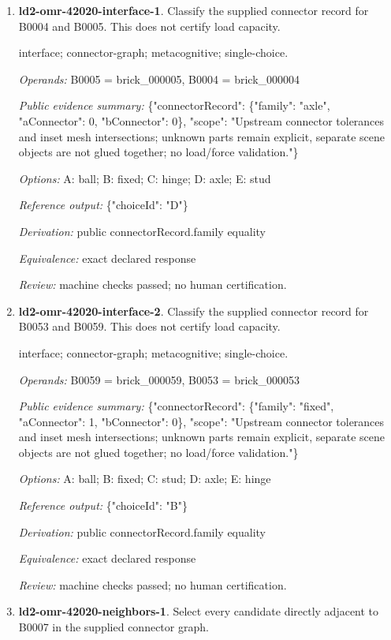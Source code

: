 \begin{enumerate}
\item \textbf{ld2-omr-42020-interface-1}. Classify the supplied connector record for B0004 and B0005. This does not certify load capacity.
\par{\small interface; connector-graph; metacognitive; single-choice.\par\textit{Operands:} B0005 = brick\_000005, B0004 = brick\_000004\par\textit{Public evidence summary:} \{"connectorRecord": \{"family": "axle", "aConnector": 0, "bConnector": 0\}, "scope": "Upstream connector tolerances and inset mesh intersections; unknown parts remain explicit, separate scene objects are not glued together; no load/force validation."\}\par\textit{Options:} A: ball; B: fixed; C: hinge; D: axle; E: stud\par\textit{Reference output:} \{"choiceId": "D"\}\par\textit{Derivation:} public connectorRecord.family equality\par\textit{Equivalence:} exact declared response\par\textit{Review:} machine checks passed; no human certification.}
\item \textbf{ld2-omr-42020-interface-2}. Classify the supplied connector record for B0053 and B0059. This does not certify load capacity.
\par{\small interface; connector-graph; metacognitive; single-choice.\par\textit{Operands:} B0059 = brick\_000059, B0053 = brick\_000053\par\textit{Public evidence summary:} \{"connectorRecord": \{"family": "fixed", "aConnector": 1, "bConnector": 0\}, "scope": "Upstream connector tolerances and inset mesh intersections; unknown parts remain explicit, separate scene objects are not glued together; no load/force validation."\}\par\textit{Options:} A: ball; B: fixed; C: stud; D: axle; E: hinge\par\textit{Reference output:} \{"choiceId": "B"\}\par\textit{Derivation:} public connectorRecord.family equality\par\textit{Equivalence:} exact declared response\par\textit{Review:} machine checks passed; no human certification.}
\item \textbf{ld2-omr-42020-neighbors-1}. Select every candidate directly adjacent to B0007 in the supplied connector graph.

\end{enumerate}
